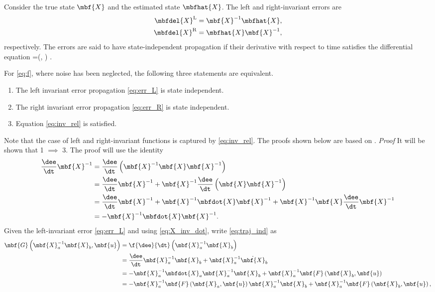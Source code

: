 Consider the true state $\mbf{X}$ and the estimated state $\mbfhat{X}$. The left and right-invariant errors are
\begin{align}
	\mbfdel{X}^\mathrm{L} & = \mbf{X}^{-1} \mbfhat{X}, \label{eq:err_L} \\
	\mbfdel{X}^\mathrm{R} & = \mbfhat{X} \mbf{X}^{-1}, \label{eq:err_R}
\end{align}
respectively. The errors are said to have state-independent propagation if their derivative with respect to time satisfies the differential equation
\beq
	\delta {} =\left(, \right) \label{eq:traj_ind}.
\eeq
\begin{theorem}
	\label{thm:inv_c}
	For \eqref{eq:f}, where noise has been neglected, the following three statements are equivalent.
	\begin{enumerate}
		\item The left invariant error propagation \eqref{eq:err_L} is state independent.
		\item The right invariant error propagation \eqref{eq:err_R} is state independent.
		\item Equation \eqref{eq:inv_rel} is satisfied.
	\end{enumerate}
\end{theorem}
Note that the case of left and right-invariant functions is captured by \eqref{eq:inv_rel}. The proofs shown below are based on \cite{Barrau2017,Barrau2015}.
\textit{Proof} It will be shown that 1 $\implies$ 3. The proof will use the identity
\begin{align}
	\frac{\dee}{\dt}\mbf{X}^{-1} & = \frac{\dee}{\dt}\left(\mbf{X}^{-1}\mbf{X}\mbf{X}^{-1}\right) \notag \\
	 & = \frac{\dee}{\dt}\mbf{X}^{-1} + \mbf{X}^{-1}\frac{\dee}{\dt}\left(\mbf{X}\mbf{X}^{-1}\right)\notag \\
	 & = \frac{\dee}{\dt}\mbf{X}^{-1} + \mbf{X}^{-1}\mbfdot{X}\mbf{X}^{-1} + \mbf{X}^{-1}\mbf{X}\frac{\dee}{\dt}\mbf{X}^{-1}\notag \\
	 & = -\mbf{X}^{-1}\mbfdot{X}\mbf{X}^{-1}. \label{eq:X_inv_dot}
\end{align}
Given the left-invariant error \eqref{eq:err_L} and using \eqref{eq:X_inv_dot}, write \eqref{eq:traj_ind} as 
\begin{align}
	\mbf{G}\left(\mbf{X}_a^{-1}\mbf{X}_b, \mbf{u}\right) &= \f{\dee}{\dt} \left(\mbf{X}_a^{-1}\mbf{X}_b\right) \notag \\
	& = \frac{\dee}{\dt}\mbf{X}_a^{-1}\mbf{X}_b + \mbf{X}_a^{-1}\dot{\mbf{X}}_b \notag \\
	& = -\mbf{X}_a^{-1}\mbfdot{X}_a\mbf{X}_a^{-1}\mbf{X}_b + \mbf{X}_a^{-1}\mbf{F}\left(\mbf{X}_b,\mbf{u}\right) \notag \\
	& = -\mbf{X}_a^{-1}\mbf{F}\left(\mbf{X}_a,\mbf{u}\right)\mbf{X}_a^{-1}\mbf{X}_b + \mbf{X}_a^{-1}\mbf{F}\left(\mbf{X}_b,\mbf{u}\right) \label{eq:p_con_1},
\end{align}
